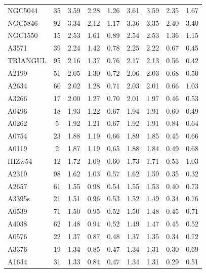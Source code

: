 \documentclass[10pt,aps,pra,reprint,amsmath,amsfonts,amssymb,showpacs,nofootinbib,floatfix]{revtex4-1}
\newcommand{\vstt}{\vspace{-0.0mm}}
\begin{document}
{\begin{table}
\begin{minipage}{2.0\columnwidth}
\begin{tabular}{l c c c c c c c c}
NGC5044  &  35 &   3.59 &   2.28 &   1.26 &   3.61 &   3.59 &   2.35 &   1.67 \vstt \\
NGC5846  &  92 &   3.34 &   2.12 &   1.17 &   3.36 &   3.35 &   2.40 &   3.40 \vstt \\
NGC1550  &  15 &   2.53 &   1.61 &   0.89 &   2.54 &   2.53 &   1.36 &   1.15 \vstt \\
A3571    &  39 &   2.24 &   1.42 &   0.78 &   2.25 &   2.22 &   0.67 &   0.45 \vstt \\
TRIANGUL &  95 &   2.16 &   1.37 &   0.76 &   2.17 &   2.13 &   0.56 &   0.42 \vstt \\
A2199    &  51 &   2.05 &   1.30 &   0.72 &   2.06 &   2.03 &   0.68 &   0.50 \vstt \\
A2634    &  60 &   2.02 &   1.28 &   0.71 &   2.03 &   2.01 &   0.66 &   1.03 \vstt \\
A3266    &  17 &   2.00 &   1.27 &   0.70 &   2.01 &   1.97 &   0.46 &   0.53 \vstt \\
A0496    &  18 &   1.93 &   1.22 &   0.67 &   1.94 &   1.91 &   0.60 &   0.49 \vstt \\
A0262    &   5 &   1.92 &   1.21 &   0.67 &   1.92 &   1.91 &   0.84 &   0.64 \vstt \\
A0754    &  23 &   1.88 &   1.19 &   0.66 &   1.89 &   1.85 &   0.45 &   0.66 \vstt \\
A0119    &   2 &   1.87 &   1.19 &   0.65 &   1.88 &   1.84 &   0.49 &   0.68 \vstt \\
IIIZw54  &  12 &   1.72 &   1.09 &   0.60 &   1.73 &   1.71 &   0.53 &   1.03 \vstt \\
A2319    &  98 &   1.62 &   1.03 &   0.57 &   1.62 &   1.59 &   0.35 &   0.32 \vstt \\
A2657    &  61 &   1.55 &   0.98 &   0.54 &   1.55 &   1.53 &   0.40 &   0.73 \vstt \\
A3395s   &  21 &   1.51 &   0.96 &   0.53 &   1.52 &   1.49 &   0.34 &   0.76 \vstt \\
A0539    &  71 &   1.50 &   0.95 &   0.52 &   1.50 &   1.48 &   0.45 &   0.71 \vstt \\
A4038    &  62 &   1.48 &   0.94 &   0.52 &   1.49 &   1.47 &   0.45 &   0.52 \vstt \\
A0576    &  22 &   1.37 &   0.87 &   0.48 &   1.37 &   1.35 &   0.34 &   0.72 \vstt \\
A3376    &  19 &   1.34 &   0.85 &   0.47 &   1.34 &   1.31 &   0.30 &   0.69 \vstt \\
A1644    &  31 &   1.33 &   0.84 &   0.47 &   1.34 &   1.31 &   0.29 &   0.51 \vstt \\

\end{tabular}
\end{minipage}
\end{table}}
\end{document}
